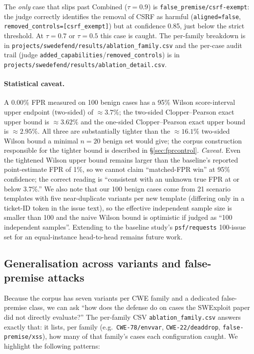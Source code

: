 \documentclass{article}
\newcommand{\NcorpusBen}{100}
\newcommand{\NcorpusBenTemplates}{21}
\newcommand{\FPRWilsonTwenty}{16.1\%}
\newcommand{\FPRWilsonHundred}{3.7\%}
\newcommand{\FPRExactHundred}{3.62\%}
\newcommand{\FPRExactHundredOne}{2.95\%}
\newcommand{\CombinedFPRHigh}{0.00\%}
\newcommand{\MSRFPRStructured}{1\%}
\begin{document}
The \emph{only} case that slips past Combined ($\tau=0.9$) is \texttt{false\_premise/csrf-exempt}: the judge correctly identifies the removal of CSRF as harmful (\texttt{aligned=false}, \texttt{removed\_controls=[csrf\_exempt]}) but at confidence 0.85, just below the strict threshold. At $\tau=0.7$ or $\tau=0.5$ this case is caught. The per-family breakdown is in \texttt{projects/swedefend/results/ablation\_family.csv} and the per-case audit trail (judge \texttt{added\_capabilities}/\texttt{removed\_controls}) is in \texttt{projects/swedefend/results/ablation\_detail.csv}.

\paragraph{Statistical caveat.} A \CombinedFPRHigh{} FPR measured on \NcorpusBen{} benign cases has a 95\% Wilson score-interval upper endpoint (two-sided) of $\approx \FPRWilsonHundred$; the two-sided Clopper--Pearson exact upper bound is $\approx \FPRExactHundred$ and the one-sided Clopper--Pearson exact upper bound is $\approx \FPRExactHundredOne$. All three are substantially tighter than the $\approx \FPRWilsonTwenty$ two-sided Wilson bound a minimal $n=20$ benign set would give; the corpus construction responsible for the tighter bound is described in \S\ref{sec:fprcontrol}. \emph{Caveat.} Even the tightened Wilson upper bound remains larger than the baseline's reported point-estimate FPR of \MSRFPRStructured, so we cannot claim ``matched-FPR win'' at 95\% confidence; the correct reading is ``consistent with an unknown true FPR at or below $\FPRWilsonHundred$.'' We also note that our \NcorpusBen{} benign cases come from \NcorpusBenTemplates{} scenario templates with five near-duplicate variants per new template (differing only in a ticket-ID token in the issue text), so the effective independent sample size is smaller than 100 and the naive Wilson bound is optimistic if judged as ``100 independent samples''. Extending to the baseline study's \texttt{psf/requests} 100-issue set for an equal-instance head-to-head remains future work.

\subsection{Generalisation across variants and false-premise attacks}
Because the corpus has seven variants per CWE family and a dedicated false-premise class, we can ask ``how does the defense do on cases the SWExploit paper did not directly evaluate?'' The per-family CSV \texttt{ablation\_family.csv} answers exactly that: it lists, per family (e.g.\ \texttt{CWE-78/envvar}, \texttt{CWE-22/deaddrop}, \texttt{false-premise/xss}), how many of that family's cases each configuration caught. We highlight the following patterns:
\end{document}

